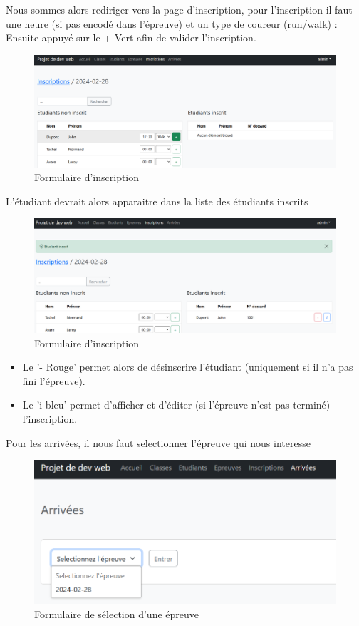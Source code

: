 \newpage
Nous sommes alors rediriger vers la page d'inscription, pour l'inscription il faut une heure (si pas encodé dans l'épreuve) et un type de coureur (run/walk) : Ensuite appuyé sur le + Vert afin de valider l'inscription.

\begin{figure}[H]
	\centering
	\includegraphics[keepaspectratio,width=12cm]{images/Emploi8}
	\caption{Formulaire d'inscription}
\end{figure}

L'étudiant devrait alors apparaitre dans la liste des étudiants inscrits

\begin{figure}[H]
	\centering
	\includegraphics[keepaspectratio,width=12cm]{images/Emploi9}
	\caption{Formulaire d'inscription}
\end{figure}

\begin{itemize}[label=$\bullet$]
	\item Le '- Rouge' permet alors de désinscrire l'étudiant (uniquement si il n'a pas fini l'épreuve).
	\item Le 'i bleu' permet d'afficher et d'éditer (si l'épreuve n'est pas terminé) l'inscription.
\end{itemize}

Pour les arrivées, il nous faut selectionner l'épreuve qui nous interesse

\begin{figure}[H]
	\centering
	\includegraphics[keepaspectratio,width=12cm]{images/Emploi10}
	\caption{Formulaire de sélection d'une épreuve}
\end{figure}

